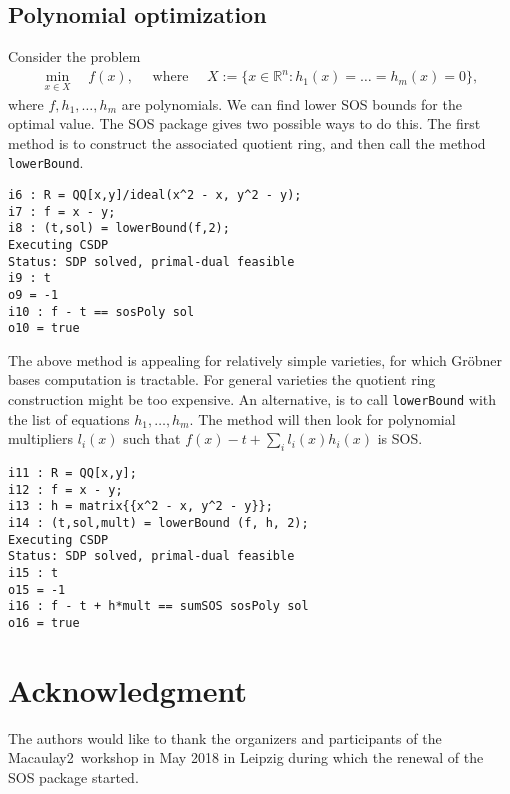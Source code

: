 \documentclass[11pt]{amsart}
\theoremstyle{plain}%
\theoremstyle{definition}
\theoremstyle{remark}
\newcommand{\Mac}{Macaulay2\xspace}
\newcommand{\SOS}{\textsc{SOS}\xspace}
\newcommand{\RR}{\mathbb{R}}
\begin{document}
\subsection*{Polynomial optimization}

Consider the problem
\begin{align*}
  \min_{x\in X} \quad f(x),
  \quad \text{ where }\quad
  X := \{x \in \RR^n : h_1(x)=\dots=h_m(x)=0\},
\end{align*}
where $f, h_1,\dots,h_m$ are polynomials.
We can find lower SOS bounds for the optimal value.
The \SOS package gives two possible ways to do this.
The first method is to construct the associated quotient ring, and then call the method \verb|lowerBound|.
{\small
\begin{verbatim}
i6 : R = QQ[x,y]/ideal(x^2 - x, y^2 - y);
i7 : f = x - y;
i8 : (t,sol) = lowerBound(f,2);
Executing CSDP
Status: SDP solved, primal-dual feasible
i9 : t
o9 = -1
i10 : f - t == sosPoly sol
o10 = true
\end{verbatim}
}
The above method is appealing for relatively simple varieties, for which Gr\"obner bases computation is tractable.
For general varieties the quotient ring construction might be too expensive.
An alternative, is to call \verb|lowerBound| with the list of equations $h_1,\dots,h_m$.
The method will then look for polynomial multipliers $l_i(x)$ such that $f(x) - t + \sum_i l_i(x)h_i(x)$ is SOS.
{\small
\begin{verbatim}
i11 : R = QQ[x,y];
i12 : f = x - y;
i13 : h = matrix{{x^2 - x, y^2 - y}};
i14 : (t,sol,mult) = lowerBound (f, h, 2);
Executing CSDP
Status: SDP solved, primal-dual feasible
i15 : t
o15 = -1
i16 : f - t + h*mult == sumSOS sosPoly sol
o16 = true
\end{verbatim}
}



\section*{Acknowledgment}
\label{sec:acknowledgement}
The authors would like to thank the organizers and participants of the
\Mac\ workshop in May 2018 in Leipzig during which the renewal of the
SOS package started.



\end{document}
